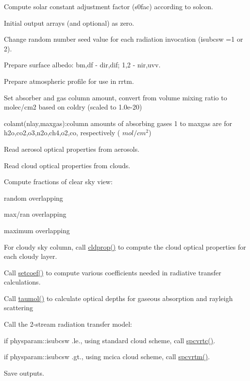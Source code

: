 \begin{DoxyEnumerate}
\item Compute solar constant adjustment factor (s0fac) according to solcon.
\item Initial output arrays (and optional) as zero.
\item Change random number seed value for each radiation invocation (isubcsw =1 or 2).
\item Prepare surface albedo\+: bm,df -\/ dir,dif; 1,2 -\/ nir,uvv.
\item Prepare atmospheric profile for use in rrtm.
\item Set absorber and gas column amount, convert from volume mixing ratio to molec/cm2 based on coldry (scaled to 1.\+0e-\/20)
\begin{DoxyItemize}
\item colamt(nlay,maxgas)\+:column amounts of absorbing gases 1 to maxgas are for h2o,co2,o3,n2o,ch4,o2,co, respectively ( $ mol/cm^2 $)
\end{DoxyItemize}
\item Read aerosol optical properties from \textquotesingle{}aerosols\textquotesingle{}.
\item Read cloud optical properties from \textquotesingle{}clouds\textquotesingle{}.
\item Compute fractions of clear sky view\+:
\begin{DoxyItemize}
\item random overlapping
\item max/ran overlapping
\item maximum overlapping
\end{DoxyItemize}
\item For cloudy sky column, call \hyperlink{group__module__radlw__main_ga6bfdea656cc7e1f773ffcc797e072e91}{cldprop()} to compute the cloud optical properties for each cloudy layer.
\item Call \hyperlink{group__module__radlw__main_gaeb7b74288cf87988c14bf6e24a2039ae}{setcoef()} to compute various coefficients needed in radiative transfer calculations.
\item Call \hyperlink{group__module__radlw__main_gab09f986fb87e796a30c889086c92aeb1}{taumol()} to calculate optical depths for gaseous absorption and rayleigh scattering
\item Call the 2-\/stream radiation transfer model\+:
\begin{DoxyItemize}
\item if physparam\+::isubcsw .le., using standard cloud scheme, call \hyperlink{group__module__radsw__main_gaeb992f35bdf7dbf9ea8709d7d91dedfd}{spcvrtc()}.
\item if physparam\+::isubcsw .gt., using mcica cloud scheme, call \hyperlink{group__module__radsw__main_ga859cc14063a58e9d0a252e4366b9fff3}{spcvrtm()}.
\end{DoxyItemize}
\item Save outputs. 
\end{DoxyEnumerate}

